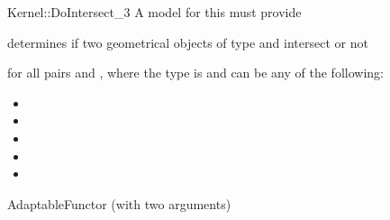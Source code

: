 \begin{ccRefFunctionObjectConcept}{Kernel::DoIntersect_3}
A model for this must provide


{determines if two geometrical objects of type 
 and  intersect or not}

for all pairs  and , where
the type  is  and 
 can be any of the following:
\begin{itemize}
\item {}
\item {}
\item {}
\item {}
\item {}
\end{itemize}

\ccRefines
AdaptableFunctor (with two arguments)

\ccSeeAlso
{}\\

\end{ccRefFunctionObjectConcept}
